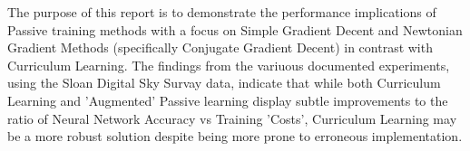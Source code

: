 \documentclass[main.tex]{subfiles}
\begin{document}
The purpose of this report is to demonstrate the performance implications of Passive training methods with a focus on Simple Gradient Decent and Newtonian Gradient Methods (specifically Conjugate Gradient Decent) in contrast with Curriculum Learning. The findings from the variuous documented experiments, using the Sloan Digital Sky Survay data, indicate that while both Curriculum Learning and 'Augmented' Passive learning display subtle improvements to the ratio of Neural Network Accuracy vs Training 'Costs', Curriculum Learning may be a more robust solution despite being more prone to erroneous implementation.
\end{document}
